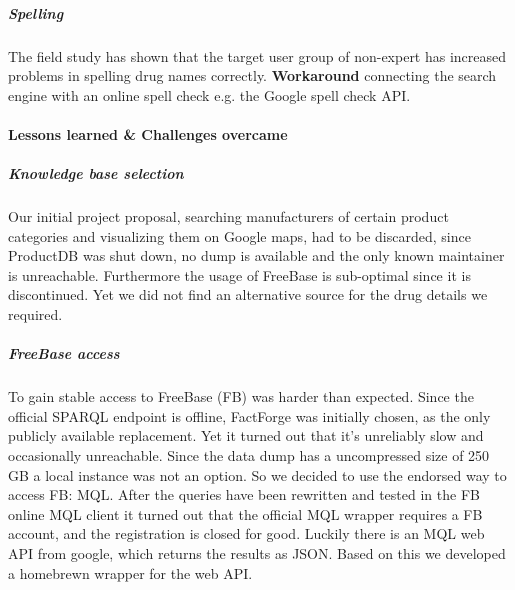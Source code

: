 \documentclass[11pt,titlepage,oneside,openany]{book}
\begin{document}
\subparagraph{Spelling}
\label{drug_spellcheck}
The field study has shown that the target user group of non-expert has increased problems in spelling drug names correctly. \textbf{Workaround} connecting the search engine with an online spell check e.g. the Google spell check API.



\paragraph{Lessons learned \& Challenges overcame}
\label{cha:lessons}

\label{challenges}

\subparagraph{Knowledge base selection} Our initial project proposal, searching manufacturers of certain product categories and visualizing them on Google maps, had to be discarded, since ProductDB was shut down, no dump is available and the only known maintainer is unreachable. Furthermore the usage of FreeBase is sub-optimal since it is discontinued. Yet we did not find an alternative source for the drug details we required. 


\subparagraph{FreeBase access}
\label{challenges:fb}
To gain stable access to FreeBase (FB) was harder than expected. Since the official SPARQL endpoint is offline, FactForge was initially chosen, as the only publicly available replacement. Yet it turned out that it's unreliably slow and occasionally unreachable. Since the data dump has a uncompressed size of 250 GB a local instance was not an option. 
So we decided to use the endorsed way to access FB: MQL. After the queries have been rewritten and tested in the FB online MQL client it turned out that the official MQL wrapper requires a FB account, and the registration is closed for good.
Luckily there is an MQL web API from google, which returns the results as JSON. Based on this we developed a homebrewn wrapper for the web API.



\appendix

\newpage
\end{document}
